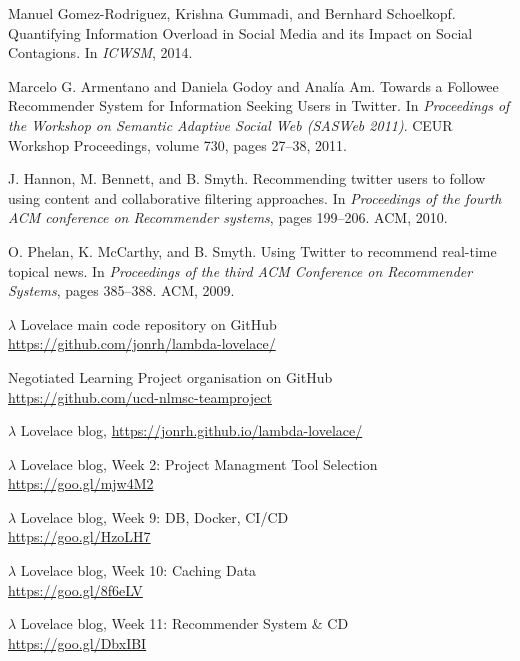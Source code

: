 \documentclass{article}
\begin{document}
\begin{thebibliography}{9} 

    Manuel Gomez-Rodriguez, Krishna Gummadi, and Bernhard Schoelkopf. Quantifying Information Overload in Social Media and its Impact on Social Contagions. In \textit{ICWSM}, 2014.
    
    Marcelo G. Armentano and Daniela Godoy and Analía Am. Towards a Followee Recommender System for Information Seeking Users in Twitter.  In \textit{Proceedings of the Workshop on Semantic Adaptive Social Web (SASWeb 2011)}. CEUR Workshop Proceedings, volume 730, pages 27–38, 2011.
    
    J. Hannon, M. Bennett, and B. Smyth. Recommending twitter users to follow using content and collaborative filtering approaches. In \textit{Proceedings of the fourth ACM conference on Recommender systems}, pages 199–206. ACM, 2010.
    
    O. Phelan, K. McCarthy, and B. Smyth. Using Twitter to recommend real-time topical news. In \textit{Proceedings of the third ACM Conference on Recommender Systems}, pages 385–388. ACM, 2009.
    
	$\lambda$ Lovelace main code repository on GitHub \\
	\url{https://github.com/jonrh/lambda-lovelace/}
	
	Negotiated Learning Project organisation on GitHub \\
	\url{https://github.com/ucd-nlmsc-teamproject}
	
	$\lambda$ Lovelace blog, \url{https://jonrh.github.io/lambda-lovelace/}
	
	$\lambda$ Lovelace blog, Week 2: Project Managment Tool Selection \\ \url{https://goo.gl/mjw4M2}
	
	$\lambda$ Lovelace blog, Week 9: DB, Docker, CI/CD \\ 
	\url{https://goo.gl/HzoLH7}
	
	$\lambda$ Lovelace blog, Week 10: Caching Data \\ 
	\url{https://goo.gl/8f6eLV}
	
	$\lambda$ Lovelace blog, Week 11: Recommender System \& CD \\ 
	\phantom{ } \url{https://goo.gl/DbxIBI}
	

\end{thebibliography}
\end{document}
